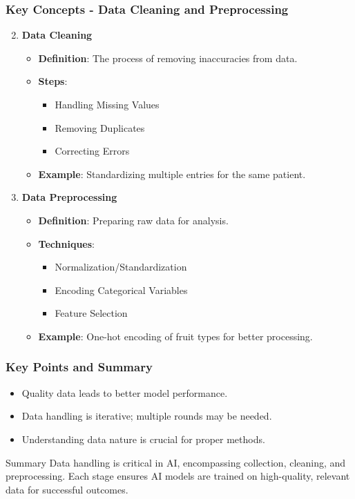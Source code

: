 \documentclass[aspectratio=169]{beamer}
\begin{document}
\begin{frame}
    \frametitle{Key Concepts - Data Cleaning and Preprocessing}
    \begin{enumerate}
        \setcounter{enumi}{1}
        \item \textbf{Data Cleaning}
            \begin{itemize}
                \item \textbf{Definition}: The process of removing inaccuracies from data.
                \item \textbf{Steps}:
                    \begin{itemize}
                        \item Handling Missing Values
                        \item Removing Duplicates
                        \item Correcting Errors
                    \end{itemize}
                \item \textbf{Example}: Standardizing multiple entries for the same patient.
            \end{itemize}
        
        \item \textbf{Data Preprocessing}
            \begin{itemize}
                \item \textbf{Definition}: Preparing raw data for analysis.
                \item \textbf{Techniques}:
                    \begin{itemize}
                        \item Normalization/Standardization
                        \item Encoding Categorical Variables
                        \item Feature Selection
                    \end{itemize}
                \item \textbf{Example}: One-hot encoding of fruit types for better processing.
            \end{itemize}
    \end{enumerate}
\end{frame}

\begin{frame}[fragile]
    \frametitle{Key Points and Summary}
    \begin{itemize}
        \item Quality data leads to better model performance.
        \item Data handling is iterative; multiple rounds may be needed.
        \item Understanding data nature is crucial for proper methods.
    \end{itemize}

    \begin{block}{Summary}
        Data handling is critical in AI, encompassing collection, cleaning, and preprocessing. Each stage ensures AI models are trained on high-quality, relevant data for successful outcomes.
    \end{block}
\end{frame}
\end{document}
